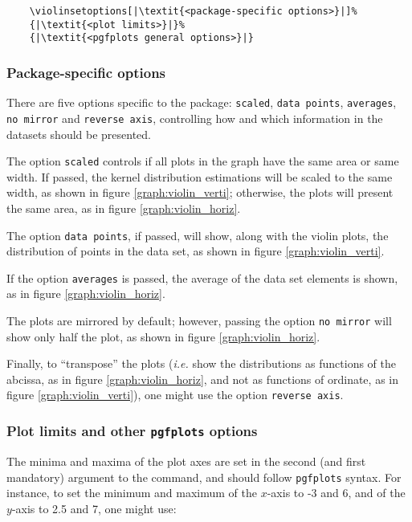 \documentclass{article}
\begin{document}
\begin{verbatim}
	\violinsetoptions[|\textit{<package-specific options>}|]%
	{|\textit{<plot limits>}|}%
	{|\textit{<pgfplots general options>}|}
\end{verbatim}

\subsubsection{Package-specific options}

There are five options specific to the package: \texttt{scaled},
\texttt{data points}, \texttt{averages}, \texttt{no mirror} and
\texttt{reverse axis}, controlling how and which information
in the datasets should be presented.

The option \texttt{scaled} controls if all plots in the graph
have the same area or same width. If passed, the kernel
distribution estimations will be scaled to the same width, as
shown in figure \ref{graph:violin_verti}; otherwise, the plots
will present the same area, as in figure \ref{graph:violin_horiz}.

The option \texttt{data points}, if passed, will show, along with
the violin plots, the distribution of points in the data set, as shown in
figure \ref{graph:violin_verti}.

If the option \texttt{averages} is passed, the average of the data set
elements is shown, as in figure \ref{graph:violin_horiz}.

The plots are mirrored by default; however, passing the option \texttt{no mirror}
will show only half the plot, as shown in figure \ref{graph:violin_horiz}.

Finally, to ``transpose'' the plots (\textit{i.e.} show the distributions
as functions of the abcissa, as in figure \ref{graph:violin_horiz},
and not as functions of ordinate, as in figure \ref{graph:violin_verti}),
one might use the option \texttt{reverse axis}.

\subsubsection{Plot limits and other \texttt{pgfplots} options}

The minima and maxima of the plot axes are set in the second (and first
mandatory) argument to the command, and should follow \texttt{pgfplots}
syntax. For instance, to set the minimum and maximum of the $x$-axis
to -3 and 6, and of the $y$-axis to 2.5 and 7, one might use:
\end{document}

